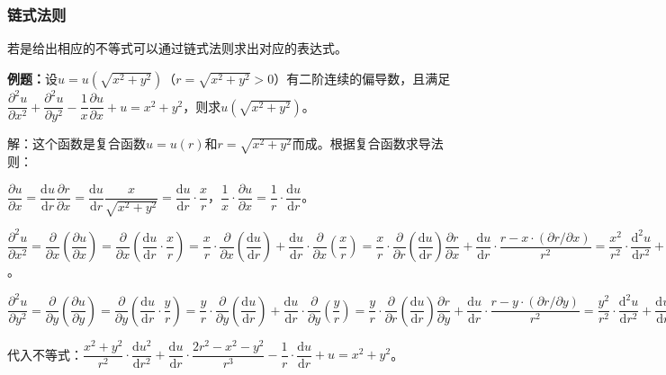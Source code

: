 \documentclass[UTF8, 12pt]{ctexart}
\begin{document}
\subsubsection{链式法则}

若是给出相应的不等式可以通过链式法则求出对应的表达式。

\textbf{例题：}设$u=u(\sqrt{x^2+y^2})$（$r=\sqrt{x^2+y^2}>0$）有二阶连续的偏导数，且满足$\dfrac{\partial^2u}{\partial x^2}+\dfrac{\partial^2u}{\partial y^2}-\dfrac{1}{x}\dfrac{\partial u}{\partial x}+u=x^2+y^2$，则求$u(\sqrt{x^2+y^2})$。

解：这个函数是复合函数$u=u(r)$和$r=\sqrt{x^2+y^2}$而成。根据复合函数求导法则：

$\dfrac{\partial u}{\partial x}=\dfrac{\textrm{d}u}{\textrm{d}r}\dfrac{\partial r}{\partial x}=\dfrac{\textrm{d}u}{\textrm{d}r}\dfrac{x}{\sqrt{x^2+y^2}}=\dfrac{\textrm{d}u}{\textrm{d}r}\cdot\dfrac{x}{r}$，$\dfrac{1}{x}\cdot\dfrac{\partial u}{\partial x}=\dfrac{1}{r}\cdot\dfrac{\textrm{d}u}{\textrm{d}r}$。

$\dfrac{\partial^2u}{\partial x^2}=\dfrac{\partial}{\partial x}\left(\dfrac{\partial u}{\partial x}\right)=\dfrac{\partial}{\partial x}\left(\dfrac{\textrm{d}u}{\textrm{d}r}\cdot\dfrac{x}{r}\right)=\dfrac{x}{r}\cdot\dfrac{\partial}{\partial x}\left(\dfrac{\textrm{d}u}{\textrm{d}r}\right)+\dfrac{\textrm{d}u}{\textrm{d}r}\cdot\dfrac{\partial}{\partial x}\left(\dfrac{x}{r}\right)=\dfrac{x}{r}\cdot\dfrac{\partial}{\partial r}\left(\dfrac{\textrm{d}u}{\textrm{d}r}\right)\dfrac{\partial r}{\partial x}+\dfrac{\textrm{d}u}{\textrm{d}r}\cdot\dfrac{r-x\cdot(\partial r/\partial x)}{r^2}=\dfrac{x^2}{r^2}\cdot\dfrac{\textrm{d}^2u}{\textrm{d}r^2}+\dfrac{\textrm{d}u}{\textrm{d}r}\cdot\dfrac{r^2-x^2}{r^3}$。

$\dfrac{\partial^2u}{\partial y^2}=\dfrac{\partial}{\partial y}\left(\dfrac{\partial u}{\partial y}\right)=\dfrac{\partial}{\partial y}\left(\dfrac{\textrm{d}u}{\textrm{d}r}\cdot\dfrac{y}{r}\right)=\dfrac{y}{r}\cdot\dfrac{\partial}{\partial y}\left(\dfrac{\textrm{d}u}{\textrm{d}r}\right)+\dfrac{\textrm{d}u}{\textrm{d}r}\cdot\dfrac{\partial}{\partial y}\left(\dfrac{y}{r}\right)=\dfrac{y}{r}\cdot\dfrac{\partial}{\partial r}\left(\dfrac{\textrm{d}u}{\textrm{d}r}\right)\dfrac{\partial r}{\partial y}+\dfrac{\textrm{d}u}{\textrm{d}r}\cdot\dfrac{r-y\cdot(\partial r/\partial y)}{r^2}=\dfrac{y^2}{r^2}\cdot\dfrac{\textrm{d}^2u}{\textrm{d}r^2}+\dfrac{\textrm{d}u}{\textrm{d}r}\cdot\dfrac{r^2-x^2}{r^3}$

代入不等式：$\dfrac{x^2+y^2}{r^2}\cdot\dfrac{\textrm{d}u^2}{\textrm{d}r^2}+\dfrac{\textrm{d}u}{\textrm{d}r}\cdot\dfrac{2r^2-x^2-y^2}{r^3}-\dfrac{1}{r}\cdot\dfrac{\textrm{d}u}{\textrm{d}r}+u=x^2+y^2$。
\end{document}
